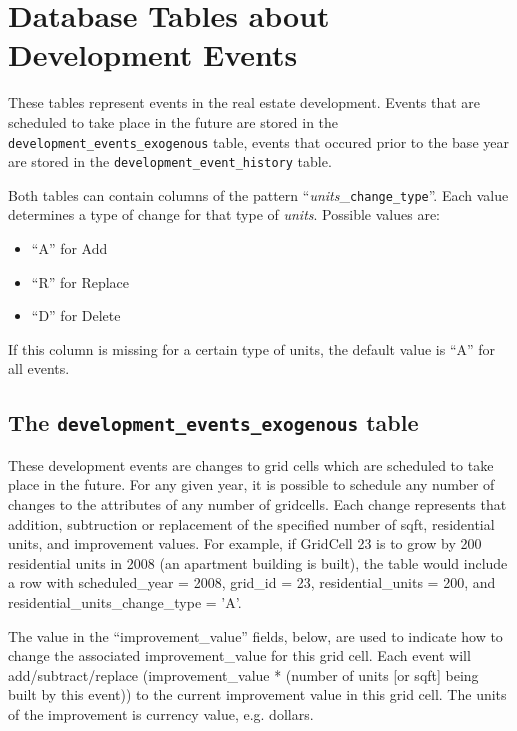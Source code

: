 \section{Database Tables about Development Events}
\label{sec:db-tables-events}
These tables represent events in the real estate development. Events that are scheduled 
to take place in the future are stored in the {\tt development_events_exogenous} table,
events that occured prior to the base year are stored in the {\tt development_event_history} table.

Both tables can contain columns of the pattern ``{\it units}_{\tt change_type}''. Each value determines
a type of change for that type of {\it units}. Possible values are:
\begin{itemize} \tight
\item ``A'' for Add
\item ``R'' for Replace
\item ``D'' for Delete
\end{itemize}
If this column is missing for a certain type of units, the default value is ``A'' for all events.

\subsection{The {\tt development_events_exogenous} table}
\label{sec:db-tables-development-events-exogenous}

These development events are changes to grid cells which are scheduled to take
place
in the future. For any given year, it is possible to schedule any number of
changes to the attributes of any number of gridcells. Each change represents
that addition, subtruction or replacement of the specified number of sqft, residential units, and
improvement values.  For example, if
GridCell 23 is to grow by 200 residential units in 2008 (an apartment building
is built), the table would include a row with scheduled_year = 2008, grid_id =
23, residential_units = 200, and residential_units_change_type = 'A'.

The value in the ``improvement_value'' fields, below, are used to indicate how
to change the associated improvement_value for this grid cell. Each event will
add/subtract/replace (improvement_value * (number
of units [or sqft] being built by this event)) to the current improvement value
in
this grid cell.  The units of the improvement is currency value, e.g. dollars.


